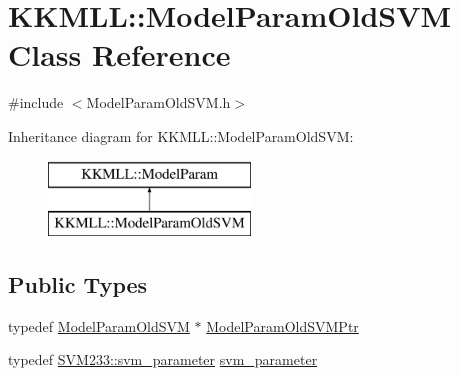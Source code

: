 \hypertarget{class_k_k_m_l_l_1_1_model_param_old_s_v_m}{}\section{K\+K\+M\+LL\+:\+:Model\+Param\+Old\+S\+VM Class Reference}
\label{class_k_k_m_l_l_1_1_model_param_old_s_v_m}


{\ttfamily \#include $<$Model\+Param\+Old\+S\+V\+M.\+h$>$}

Inheritance diagram for K\+K\+M\+LL\+:\+:Model\+Param\+Old\+S\+VM\+:\begin{figure}[H]
\begin{center}
\leavevmode
\includegraphics[height=2.000000cm]{class_k_k_m_l_l_1_1_model_param_old_s_v_m}
\end{center}
\end{figure}
\subsection*{Public Types}
\begin{DoxyCompactItemize}
\item 
typedef \hyperlink{class_k_k_m_l_l_1_1_model_param_old_s_v_m}{Model\+Param\+Old\+S\+VM} $\ast$ \hyperlink{class_k_k_m_l_l_1_1_model_param_old_s_v_m_aa1bc211ca33acbe49fa1d8dd2bd67782}{Model\+Param\+Old\+S\+V\+M\+Ptr}
\item 
typedef \hyperlink{struct_s_v_m233_1_1svm__parameter}{S\+V\+M233\+::svm\+\_\+parameter} \hyperlink{class_k_k_m_l_l_1_1_model_param_old_s_v_m_ae96c3ff03f4145985df9225fdea5aa54}{svm\+\_\+parameter}
\end{DoxyCompactItemize}

